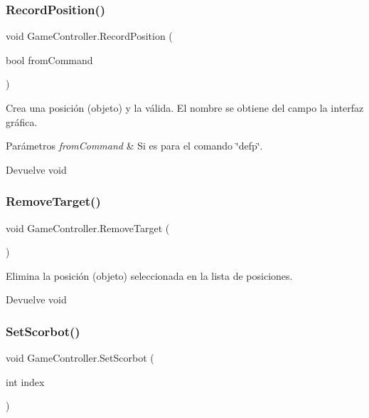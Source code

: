 \subsubsection{\texorpdfstring{RecordPosition()}{RecordPosition()}}
{\footnotesize\ttfamily void Game\+Controller.\+Record\+Position (\begin{DoxyParamCaption}\item[{bool}]{from\+Command }\end{DoxyParamCaption})\hspace{0.3cm}{\ttfamily [inline]}}

Crea una posición (objeto) y la válida. El nombre se obtiene del campo la interfaz gráfica. 
\begin{DoxyParams}{Parámetros}
{\em from\+Command} & Si es para el comando \char`\"{}defp\char`\"{}. \\
\hline
\end{DoxyParams}
\begin{DoxyReturn}{Devuelve}
void 
\end{DoxyReturn}
\mbox{\label{class_game_controller_ad8f76a41d0163fd06971dffce1d61c97}} 
\subsubsection{\texorpdfstring{RemoveTarget()}{RemoveTarget()}}
{\footnotesize\ttfamily void Game\+Controller.\+Remove\+Target (\begin{DoxyParamCaption}{ }\end{DoxyParamCaption})\hspace{0.3cm}{\ttfamily [inline]}}

Elimina la posición (objeto) seleccionada en la lista de posiciones. \begin{DoxyReturn}{Devuelve}
void 
\end{DoxyReturn}
\mbox{\label{class_game_controller_aa448386fb4d83ff0ca9211424ad6b020}} 
\subsubsection{\texorpdfstring{SetScorbot()}{SetScorbot()}}
{\footnotesize\ttfamily void Game\+Controller.\+Set\+Scorbot (\begin{DoxyParamCaption}\item[{int}]{index }\end{DoxyParamCaption})\hspace{0.3cm}{\ttfamily [inline]}}

